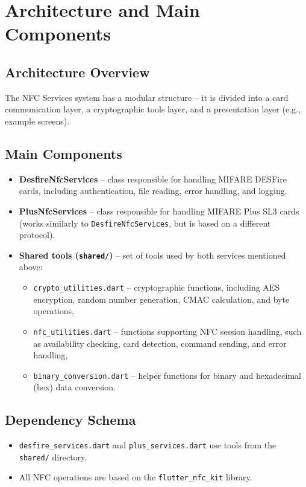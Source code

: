 \documentclass[a4paper,12pt]{article}
\begin{document}
\section{Architecture and Main Components}

\subsection{Architecture Overview}
The NFC Services system has a modular structure – it is divided into a card communication layer, a cryptographic tools layer, and a presentation layer (e.g., example screens).

\subsection{Main Components}

\begin{itemize}
    \item \textbf{DesfireNfcServices} – class responsible for handling MIFARE DESFire cards, including authentication, file reading, error handling, and logging.
    
    \item \textbf{PlusNfcServices} – class responsible for handling MIFARE Plus SL3 cards (works similarly to \texttt{DesfireNfcServices}, but is based on a different protocol).
    
    \item \textbf{Shared tools (\texttt{shared/})} – set of tools used by both services mentioned above:
    \begin{itemize}
        \item \texttt{crypto\_utilities.dart} – cryptographic functions, including AES encryption, random number generation, CMAC calculation, and byte operations,
        \item \texttt{nfc\_utilities.dart} – functions supporting NFC session handling, such as availability checking, card detection, command sending, and error handling,
        \item \texttt{binary\_conversion.dart} – helper functions for binary and hexadecimal (hex) data conversion.
    \end{itemize}
    
\end{itemize}

\subsection{Dependency Schema}
\begin{itemize}
    \item \texttt{desfire\_services.dart} and \texttt{plus\_services.dart} use tools from the \texttt{shared/} directory.
    \item All NFC operations are based on the \texttt{flutter\_nfc\_kit} library.
\end{itemize}
\end{document}
